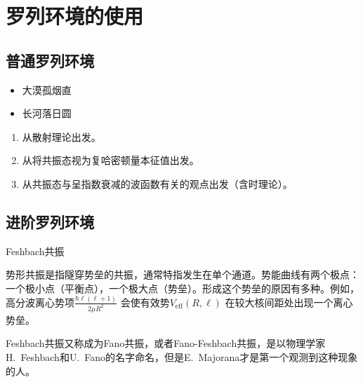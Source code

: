 
\chapter{罗列环境的使用}



\section{普通罗列环境}



\begin{itemize}
    \addtolength{\itemsep}{-.36\baselineskip}%
    \item 大漠孤烟直
    \item 长河落日圆
\end{itemize}




\begin{enumerate}
    \item 从散射理论出发。
    \item 从将共振态视为复哈密顿量本征值出发。
    \item 从共振态与呈指数衰减的波函数有关的观点出发（含时理论）。
\end{enumerate}

\section{进阶罗列环境}


\begin{yklist}{Feshbach共振}
    \item[势形共振] 势形共振是指隧穿势垒的共振，通常特指发生在单个通道。势能曲线有两个极点：一个极小点（平衡点），一个极大点（势垒）。形成这个势垒的原因有多种。例如，高分波离心势项$\frac{\hbar \ell(\ell+1)}{2\mu R^2}$ 会使有效势$ V_{\text{eff}}(R,\ell) $ 在较大核间距处出现一个离心势垒。
    \item[Feshbach共振] Feshbach共振又称成为Fano共振，或者Fano-Feshbach共振，是以物理学家H.~Feshbach和U.~Fano的名字命名\cite{RN1793,RN417,RN38}，但是E.~Majorana才是第一个观测到这种现象的人\cite{RN2608}。
\end{yklist}










